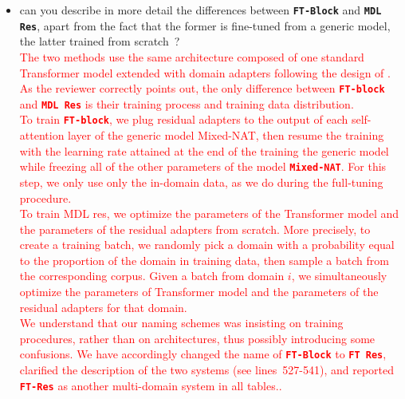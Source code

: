 \documentclass[12pt,times,a4paper,twoside]{article}
\newcommand{\fyTodo}[1]{\Todo[FY:]{\textcolor{orange}{#1}}}
\newcommand{\fyDone}[1]{\done[FY]\Todo[FY:]{\textcolor{orange}{#1}}}
\theoremstyle{definition}
\newcommand{\system}[1]{\texttt{\textbf{#1}}}
\begin{document}
\begin{itemize}
\item can you describe in more detail the differences between \system{FT-Block} and \system{MDL Res}, apart from the fact that the former is fine-tuned from a generic model, the latter trained from scratch~?
  \\
  \textcolor{red}{%
    The two methods use the same architecture composed of one standard Transformer model extended with domain adapters following the design of \cite{Bapna19simple}. As the reviewer correctly points out, the only difference between \system{FT-block} and \system{MDL Res} is their training process and training data distribution.
    \\
    To train \system{FT-block}, we plug residual adapters to the output of each self-attention layer of the generic model Mixed-NAT, then resume the training with the learning rate attained at the end of the training the generic model while freezing all of the other parameters of the model \system{Mixed-NAT}. For this step, we only use only the in-domain data, as we do during the full-tuning procedure.
    \\
    To train MDL res, we optimize the parameters of the Transformer model and the parameters of the residual adapters from scratch. More precisely, to create a training batch, we randomly pick a domain with a probability equal to the proportion of the domain in training data, then sample a batch from the corresponding corpus. Given a batch from domain $i$, we simultaneously optimize the parameters of Transformer model and the parameters of the residual adapters for that domain.
    \\
    We understand that our naming schemes was insisting on training procedures, rather than on architectures, thus possibly introducing some confusions. We have accordingly changed the name of \system{FT-Block} to \system{FT Res}, clarified the description of the two systems (see lines~527-541\fyTodo{fix this}), and reported \system{FT-Res}\fyDone{or new name} as another multi-domain system in all tables.\fyTodo{Make sure it is the case}.}
\end{itemize}
\end{document}
